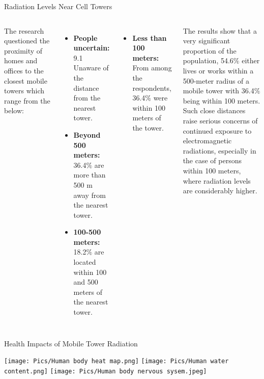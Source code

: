\documentclass[7pt, aspectratio=169]{beamer}
\begin{document}
\begin{frame}{Radiation Levels Near Cell Towers}
\begin{columns}
    The research questioned the proximity of homes and offices to the closest mobile towers which range from the below:
    \begin{itemize}
        \item \textbf{People uncertain:} 9.1 Unaware of the distance from the nearest tower.
        \item \textbf{Beyond 500 meters:} 36.4\(\%\) are more than 500 m away from the nearest tower.
        \item \textbf{100-500 meters:} 18.2\(\%\) are located within 100 and 500 meters of the nearest tower.
    \end{itemize}

    
    \begin{itemize}
        \item \textbf{Less than 100 meters:} From among the respondents, 36.4\(\%\) were within 100 meters of the tower.
    \end{itemize}
    The results show that a very significant proportion of the population, 54.6\(\%\) either lives or works within a 500-meter radius of a mobile tower with 36.4\(\%\) being within 100 meters.\\
    \vspace{0.1cm}
    Such close distances raise serious concerns of continued exposure to electromagnetic radiations, especially in the case of persons within 100 meters, where radiation levels are considerably higher.

    
\end{columns}
    
\end{frame}
\begin{frame}{Health Impacts of Mobile Tower Radiation}
\begin{center}
    \texttt{[image: Pics/Human body heat map.png]}
    \texttt{[image: Pics/Human water content.png]}
    \texttt{[image: Pics/Human body nervous sysem.jpeg]}
\end{center}
    
\end{frame}
\end{document}
